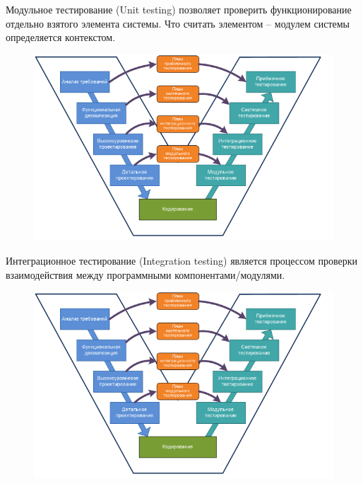 \documentclass[xcolor=table]{beamer}
\begin{document}
\begin{frame}{Модульное тестирование (Unit testing)}
	позволяет проверить функционирование отдельно взятого элемента системы. Что считать элементом – модулем системы определяется контекстом.
	\begin{figure}[h]
		\centering
		\includegraphics[scale=0.6]{images/testing-levels.png}
	\end{figure}
\end{frame}

\begin{frame}{Интеграционное тестирование (Integration testing)}
	является процессом проверки взаимодействия между программными компонентами/модулями. 
	\begin{figure}[h]
		\centering
		\includegraphics[scale=0.6]{images/testing-levels.png}
	\end{figure}
\end{frame}
\end{document}
